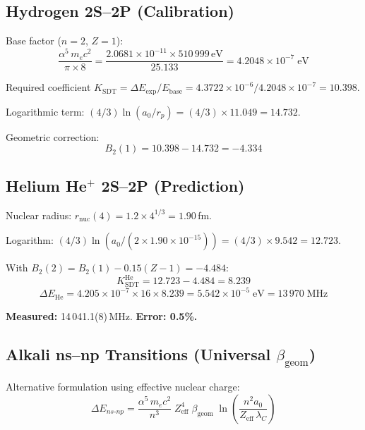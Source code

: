 \subsection{Hydrogen 2S--2P (Calibration)}

Base factor ($n=2$, $Z=1$):
\begin{equation}
  \frac{\alpha^5\,m_e c^2}{\pi \times 8}
    = \frac{2.0681 \times 10^{-11} \times 510\,999\,\text{eV}}{25.133}
    = 4.2048 \times 10^{-7}\;\text{eV}
\end{equation}

Required coefficient $K_{\text{SDT}} = \Delta E_{\exp}/E_{\text{base}} = 4.3722 \times 10^{-6} / 4.2048 \times 10^{-7} = 10.398$.

Logarithmic term: $(4/3)\ln(a_0/r_p) = (4/3) \times 11.049 = 14.732$.

Geometric correction:
\begin{equation}
  B_2(1) = 10.398 - 14.732 = -4.334
\end{equation}

\subsection{Helium He$^+$ 2S--2P (Prediction)}

Nuclear radius: $r_{\text{nuc}}(4) = 1.2 \times 4^{1/3} = 1.90$\,fm.

Logarithm: $(4/3)\ln(a_0/(2 \times 1.90 \times 10^{-15})) = (4/3) \times 9.542 = 12.723$.

With $B_2(2) = B_2(1) - 0.15(Z-1) = -4.484$:
\begin{equation}
  K_{\text{SDT}}^{\text{He}} = 12.723 - 4.484 = 8.239
\end{equation}
\begin{equation}
  \Delta E_{\text{He}} = 4.205 \times 10^{-7} \times 16 \times 8.239
    = 5.542 \times 10^{-5}\;\text{eV} = 13\,970\;\text{MHz}
\end{equation}

\textbf{Measured:} 14\,041.1(8)\,MHz.  \textbf{Error: 0.5\%.}

\subsection{Alkali ns--np Transitions (Universal $\beta_{\text{geom}}$)}

Alternative formulation using effective nuclear charge:
\begin{equation}
  \Delta E_{ns\text{-}np} = \frac{\alpha^5\,m_e c^2}{n^3}\;Z_{\text{eff}}^4\;\beta_{\text{geom}}
    \;\ln\!\left(\frac{n^2 a_0}{Z_{\text{eff}}\,\lambda_C}\right)
\end{equation}

